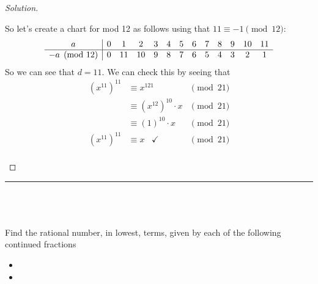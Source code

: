 \documentclass[11pt]{article}
\newenvironment{myproblem}[1][Problem]{\begin{trivlist}
    \item[\hskip \labelsep {\bfseries #1.}]}{\end{trivlist}}
\newenvironment{solution}
  {\renewcommand\qedsymbol{$~$}\begin{proof}[Solution]$ $\par\nobreak\ignorespaces}
  {\end{proof}}
\begin{document}
\begin{solution}
\begin{itemize}
          So let's create a chart for mod 12 as follows using that $11\equiv -1 \pmod{12}$:
          \[\begin{array}{c| *{12}{c}}
              a            & 0 & 1  & 2  & 3 & 4 & 5 & 6 & 7 & 8 & 9 & 10 & 11 \\
              \hline
              -a \pmod{12} & 0 & 11 & 10 & 9 & 8 & 7 & 6 & 5 & 4 & 3 & 2  & 1  \\
            \end{array}\]
          So we can see that $d=11$. We can check this by seeing that
          \begin{align*}
            (x^{11})^{11} & \equiv x^{121}               & \pmod{21} \\
                          & \equiv (x^{12})^{10} \cdot x & \pmod{21} \\
                          & \equiv (1)^{10} \cdot x      & \pmod{21} \\
            (x^{11})^{11} & \equiv x  \;\;\; \checkmark  & \pmod{21} \\
          \end{align*}
  \end{itemize}
\end{solution}



\hrule
~\newline

\section{}

\begin{myproblem}
  Find the rational number, in lowest, terms, given by each of the following continued fractions
  \begin{itemize}
    \item [(a)] [3,2,1]
    \item [(b)] [3,7,15,1]
  \end{itemize}
\end{myproblem}
\end{document}
